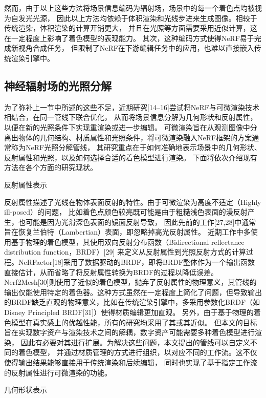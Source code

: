 然而，由于以上这些方法将场景信息编码为辐射场，场景中的每一个着色点均被视为自发光光源，
因此以上方法均依赖于体积渲染和光线步进来生成图像。相较于传统渲染，体积渲染的计算开销更大，
并且在光照等方面需要采用近似计算，这在一定程度上影响了着色模型的表现能力。
其次，这种编码方式使得NeRF易于完成新视角合成任务，
但限制了NeRF在下游编辑任务中的应用，也难以直接嵌入传统渲染引擎中。


\subsection{神经辐射场的光照分解}

为了弥补上一节中所述的这些不足，近期研究[14–16]尝试将NeRF与可微渲染技术相结合，在同一管线下联合优化，
从而将场景信息分解为几何形状和反射属性，以便在新的光照条件下实现重渲染或进一步编辑。
可微渲染旨在从观测图像中分离出物体的几何结构、材质属性和光照条件，将可微渲染融入NeRF框架的方案通常称为NeRF光照分解管线，
其研究重点在于如何准确地表示场景中的几何形状、反射属性和光照，以及如何选择合适的着色模型进行渲染。
下面将依次介绍现有方法在各个方面的研究现状。

反射属性表示

反射属性描述了光线在物体表面反射的特性。由于可微渲染为高度不适定（Highly ill-posed）的问题，
比如着色点颜色较亮既可能是由于粗糙浅色表面的漫反射产生，也可能是因为光滑深色表面的镜面反射导致，
因此先前的工作[27,28]中通常旨在恢复兰伯特（Lambertian）表面，即忽略掉高光反射属性。
近期工作中多使用基于物理的着色模型，其使用双向反射分布函数（Bidirectional reflectance distribution function，BRDF）[29] 来定义从反射属性到光照反射方式的计算过程。NeRFactor[18]采用了数据驱动的BRDF，即将BRDF整体作为一个输出函数直接估计，从而省略了将反射属性转换为BRDF的过程以降低误差。Nerf2Mesh[30]则使用了近似的着色模型，抛弃了反射属性的物理意义，其管线的输出仅能使用特定的着色器。这种方式虽然在一定程度上简化了问题，但导致输出的BRDF缺乏直观的物理意义，比如在传统渲染引擎中，多采用参数化BRDF（如Disney Principled BRDF[31]）使得材质编辑更加直观。
另外，由于基于物理的着色模型在真实感上的优越性能，所有的研究均采用了其或其近似。
但本文的目标旨在实现数字资产与渲染技术之间的解耦，数字资产可能需要多种着色模型进行渲染，
因此有必要对其进行扩展。为解决这些问题，本文提出的管线可以自定义不同的着色模型，
并通过材质管理的方式进行组织，以对应不同的工作流。这不仅使得输出结果能够直接用于传统渲染和后续编辑，
同时也实现了基于指定工作流的反射属性进行可微渲染的功能。

几何形状表示

